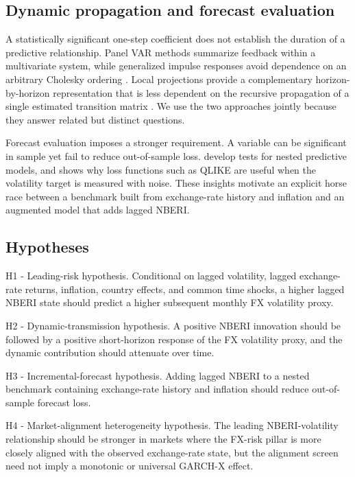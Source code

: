 \documentclass[11pt]{article}
\begin{document}
\subsection{Dynamic propagation and forecast
evaluation}\label{dynamic-propagation-and-forecast-evaluation}

A statistically significant one-step coefficient does not establish the
duration of a predictive relationship. Panel VAR methods summarize
feedback within a multivariate system, while generalized impulse
responses avoid dependence on an arbitrary Cholesky ordering \citep{pesaran1998}. Local projections provide a complementary
horizon-by-horizon representation that is less dependent on the
recursive propagation of a single estimated transition matrix \citep{jorda2005}. We use the two approaches jointly because they answer related but distinct questions.

Forecast evaluation imposes a stronger requirement. A variable can
be significant in sample yet fail to reduce out-of-sample loss. \citet{clark2007} develop tests for nested predictive models, and \citet{patton2011} shows why loss functions such as QLIKE are useful when the
volatility target is measured with noise. These insights motivate an
explicit horse race between a benchmark built from exchange-rate history
and inflation and an augmented model that adds lagged NBERI.

\subsection{Hypotheses}\label{hypotheses}

H1 - Leading-risk hypothesis. Conditional on lagged volatility, lagged
exchange-rate returns, inflation, country effects, and common time
shocks, a higher lagged NBERI state should predict a higher subsequent
monthly FX volatility proxy.

H2 - Dynamic-transmission hypothesis. A positive NBERI innovation should
be followed by a positive short-horizon response of the FX volatility
proxy, and the dynamic contribution should attenuate over time.

H3 - Incremental-forecast hypothesis. Adding lagged NBERI to a nested
benchmark containing exchange-rate history and inflation should reduce
out-of-sample forecast loss.

H4 - Market-alignment heterogeneity hypothesis. The leading
NBERI-volatility relationship should be stronger in markets where the
FX-risk pillar is more closely aligned with the observed exchange-rate
state, but the alignment screen need not imply a monotonic or universal
GARCH-X effect.
\end{document}
